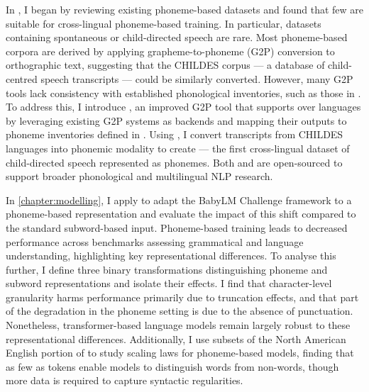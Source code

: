 In , I began by reviewing existing phoneme-based datasets and found that few are suitable for cross-lingual phoneme-based training. In particular, datasets containing spontaneous or child-directed speech are rare. Most phoneme-based corpora are derived by applying grapheme-to-phoneme (G2P) conversion to orthographic text, suggesting that the CHILDES corpus --- a database of child-centred speech transcripts --- could be similarly converted. However, many G2P tools lack consistency with established phonological inventories, such as those in \phoible. To address this, I introduce \gpp, an improved G2P tool that supports over  languages by leveraging existing G2P systems as backends and mapping their outputs to phoneme inventories defined in \phoible. Using \gpp, I convert transcripts from  CHILDES languages into phonemic modality to create \ipachildes --- the first cross-lingual dataset of child-directed speech represented as phonemes. Both \gpp and \ipachildes are open-sourced to support broader phonological and multilingual NLP research.

In \cref{chapter:modelling}, I apply \gpp to adapt the BabyLM Challenge framework to a phoneme-based representation and evaluate the impact of this shift compared to the standard subword-based input. Phoneme-based training leads to decreased performance across benchmarks assessing grammatical and language understanding, highlighting key representational differences. To analyse this further, I define three binary transformations distinguishing phoneme and subword representations and isolate their effects. I find that character-level granularity harms performance primarily due to truncation effects, and that part of the degradation in the phoneme setting is due to the absence of punctuation. Nonetheless, transformer-based language models remain largely robust to these representational differences. Additionally, I use subsets of the North American English portion of \ipachildes to study scaling laws for phoneme-based models, finding that as few as  tokens enable models to distinguish words from non-words, though more data is required to capture syntactic regularities.

